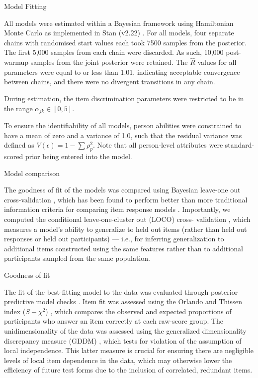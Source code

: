 \documentclass[a4paper,man,natbib]{apa6}
\makeatletter
\renewcommand{\subsubsection}{\@startsection{subsubsection}{3}
  {\z@}%
  {\b@level@two@skip}{\e@level@two@skip}%
  {\normalfont\normalsize\bfseries}}
\makeatother
\begin{document}
\subsubsection{Model Fitting}

All models were estimated within a Bayesian framework using Hamiltonian Monte Carlo as implemented in Stan (v2.22) \citep{carpenter2017stan}. For all models, four separate chains with randomised start values each took 7500 samples from the posterior. The first 5,000 samples from each chain were discarded. As such, 10,000 post-warmup samples from the joint posterior were retained. The $\hat{R}$ values for all parameters were equal to or less than 1.01, indicating acceptable convergence between chains, and there were no divergent transitions in any chain. 

During estimation, the item discrimination parameters were restricted to be in the range $\alpha_{jk} \in [0, 5]$.

To ensure the identifiability of all models, person abilities were constrained to have a mean of zero and a variance of 1.0, such that the residual variance was defined as $V(\epsilon) = 1 - \sum \rho_p^2$. Note that all person-level attributes were standard-scored prior being entered into the model.

\subsubsection{Model comparison}

The goodness of fit of the models was compared using Bayesian leave-one out cross-validation \citep{vehtari2017practical}, which has been found to perform better than more traditional information criteria for comparing item response models \citep{luo2017performances}. Importantly, we computed the conditional leave-one-cluster out (LOCO) cross- validation \citep{merkle2019bayesian}, which measures a model's ability to generalize to held out items (rather than held out responses or held out participants) --- i.e., for inferring generalization to additional items constructed using the same features rather than to additional participants sampled from the same population.

\subsubsection{Goodness of fit}

The fit of the best-fitting model to the data was evaluated through posterior predictive model checks \citep{gelman1996posterior, levy2017bayesian}. Item fit was assessed using the Orlando and Thissen index ($S-\chi^2$) \citep{toribio2011discrepancy}, which compares the observed and expected proportions of participants who answer an item correctly at each raw-score group. The unidimensionality of the data was assessed using the generalized dimensionality discrepancy measure (GDDM) \citep{levy2011generalized}, which tests for violation of the assumption of local independence. This latter measure is crucial for ensuring there are negligible levels of local item dependence in the data, which may otherwise lower the efficiency of future test forms due to the inclusion of correlated, redundant items.    
\end{document}
